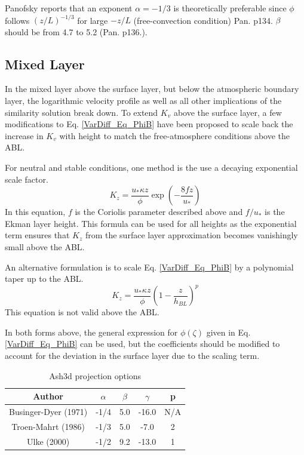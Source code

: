 Panofsky reports that an exponent $\alpha=-1/3$ is theoretically preferable
since $\phi$ follows $(z/L)^{-1/3}$ for large $-z/L$ (free-convection condition) Pan. p134.
$\beta$ should be from 4.7 to 5.2 (Pan. p136.).

\subsection{Mixed Layer}
In the mixed layer above the surface layer, but below the atmospheric boundary layer,
the logarithmic velocity profile as well as all other implications of the similarity
solution break down. To extend $K_v$ above the surface layer, a few modifications to
Eq. \ref{VarDiff_Eq_PhiB} have been proposed to scale back the increase in $K_v$ with
height to match the free-atmosphere conditions above the ABL.

For neutral and stable conditions, one method is the use a decaying exponential scale
factor.
\begin{equation}\label{VarDiff_Eq_Kz_Mixed_Exp}
K_z = \frac{u_{*} \kappa z}{\phi} \exp \left( -\frac{8 f z}{u_*} \right)
\end{equation}
In this equation, $f$ is the Coriolis parameter described above and $f/u_*$ is
the Ekman layer height. This formula can be used for all heights as the exponential
term ensures that $K_z$ from the surface layer approximation becomes vanishingly
small above the ABL.

An alternative formulation is to scale Eq. \ref{VarDiff_Eq_PhiB} by a polynomial taper
up to the ABL.
\begin{equation}\label{VarDiff_Eq_Kz_Mixed_Poly}
K_z = \frac{u_{*} \kappa z}{\phi} \left( 1-\frac{z}{h_{BL}} \right)^p
\end{equation}
This equation is not valid above the ABL.

In both forms above, the general expression for $\phi(\zeta)$ given in Eq. \ref{VarDiff_Eq_PhiB}
can be used, but the coefficients should be modified to account for the deviation in the
surface layer due to the scaling term.

\small
\begin{table}[htbp]
\begin{center}
\begin{tabular}{| c | c | c | c | c |}
\hline
Author & $\alpha$ & $\beta$ & $\gamma$ & p \\
\hline
Businger-Dyer (1971)     & -1/4 & 5.0 & -16.0 & N/A \\
Troen-Mahrt (1986) \cite{Troen1986}      & -1/3 & 5.0 & -7.0  & 2 \\
Ulke (2000)        \cite{Ulke2000}      & -1/2 & 9.2 & -13.0 & 1 \\
\hline
\end{tabular}
\caption{\label{tab:ProjOpt}Ash3d projection options}
\end{center}
\end{table}
\normalsize



